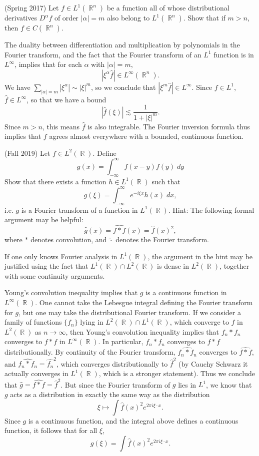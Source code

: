 \documentclass[answers]{exam}
\DeclareMathOperator{\RR}{\mathbb{R}}
\begin{document}
\begin{questions}
\question (Spring 2017) Let $f \in L^1(\RR^n)$ be a function all of whose distributional derivatives $D^\alpha f$ of order $|\alpha| = m$ also belong to $L^1(\RR^n)$. Show that if $m > n$, then $f \in C(\RR^n)$.
\begin{solution}
    The duality between differentiation and multiplication by polynomials in the Fourier transform, and the fact that the Fourier transform of an $L^1$ function is in $L^\infty$, implies that for each $\alpha$ with $|\alpha| = m$,
    \[ |\xi^\alpha \widehat{f}| \in L^\infty(\RR^n). \]
    We have $\sum_{|\alpha| = m} |\xi^\alpha| \sim |\xi|^m$, so we conclude that $|\xi^m \widehat{f}| \in L^\infty$. Since $f \in L^1$, $\widehat{f} \in L^\infty$, so that we have a bound
    \[ |\widehat{f}(\xi)| \lesssim \frac{1}{1 + |\xi|^m}. \]
    Since $m > n$, this means $\widehat{f}$ is also integrable. The Fourier inversion formula thus implies that $f$ agrees almost everywhere with a bounded, continuous function.
\end{solution}

\question (Fall 2019) Let $f \in L^2(\RR)$. Define
%
\[ g(x) = \int_{-\infty}^\infty f(x-y) f(y)\; dy \]
%
Show that there exists a function $h \in L^1(\RR)$ such that
%
\[ g(\xi) = \int_{-\infty}^\infty e^{- i \xi x} h(x)\; dx, \]
%
i.e. $g$ is a Fourier transform of a function in $L^1(\RR)$. Hint: The following formal argument may be helpful:
%
\[ \widehat{g}(x) = \widehat{f * f}(x) = \widehat{f}(x)^2, \]
%
where $*$ denotes convolution, and $\widehat{\cdot}$ denotes the Fourier transform.
\begin{solution}
    If one only knows Fourier analysis in $L^1(\RR)$, the argument in the hint may be justified using the fact that $L^1(\RR) \cap L^2(\RR)$ is dense in $L^2(\RR)$, together with some continuity arguments.
    
    Young's convolution inequality implies that $g$ is a continuous function in $L^\infty(\RR)$. One cannot take the Lebesgue integral defining the Fourier transform for $g$, but one may take the distributional Fourier transform. If we consider a family of functions $\{ f_n \}$ lying in $L^2(\RR) \cap L^1(\RR)$, which converge to $f$ in $L^2(\RR)$ as $n \to \infty$, then Young's convolution inequality implies that $f_n * f_n$ converges to $f * f$ in $L^\infty(\RR)$. In particular, $f_n * f_n$ converges to $f * f$ distributionally. By continuity of the Fourier transform, $\widehat{f_n * f_n}$ converges to $\widehat{f * f}$, and $\widehat{f_n * f_n} = \widehat{f_n}^2$, which converges distributionally to $\widehat{f}^2$ (by Cauchy Schwarz it actually converges in $L^1(\RR)$, which is a stronger statement). Thus we conclude that $\widehat{g} = \widehat{f * f} = \widehat{f}^2$. But since the Fourier transform of $g$ lies in $L^1$, we know that $g$ acts as a distribution in exactly the same way as the distribution
    \[ \xi \mapsto \int \widehat{f}(x)^2 e^{2 \pi i \xi \cdot x}. \]
    Since $g$ is a continuous function, and the integral above defines a continuous function, it follows that for all $\xi$,
    \[ g(\xi) = \int \widehat{f}(x)^2 e^{2 \pi i \xi \cdot x}. \]
\end{solution}


\end{questions}
\end{document}
